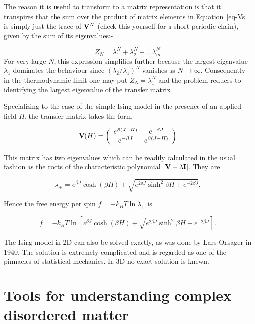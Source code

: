 \documentclass[
  letterpaper,
  DIV=11,
  numbers=noendperiod]{scrreprt}
\begin{document}
The reason it is useful to transform to a matrix representation is that
it transpires that the sum over the product of matrix elements in
Equation~\ref{eq-Vs} is simply just the trace of \({\bf V}^N\) (check
this yourself for a short periodic chain), given by the sum of its
eigenvalues:-

\[Z_N=\lambda_1^N+\lambda_2^N+...\lambda_m^N\] For very large \(N\),
this expression simplifies further because the largest eigenvalue
\(\lambda_1\) dominates the behaviour since \((\lambda_2/\lambda_1)^N\)
vanishes as \(N\rightarrow \infty\). Consequently in the thermodynamic
limit one may put \(Z_N=\lambda_1^N\) and the problem reduces to
identifying the largest eigenvalue of the transfer matrix.

Specializing to the case of the simple Ising model in the presence of an
applied field \(H\), the transfer matrix takes the form

\[{\bf V}(H)=\left(
\begin{array}{cc}
e^{\beta(J+H)} & e^{-\beta J} \\
e^{-\beta J}   & e^{\beta(J-H)}
\end{array} \right)\]

This matrix has two eigenvalues which can be readily calculated in the
usual fashion as the roots of the characteristic polynomial
\(|{\bf V}-\lambda{\bf I}|\). They are

\[\lambda_{\pm}=e^{\beta J}\cosh(\beta H) \pm \sqrt{e^{2\beta J}\sinh^2\beta H+e^{-2\beta J}}.\]

Hence the free energy per spin \(f=-k_BT\ln \lambda_+\) is

\[f=-k_BT\ln \left[e^{\beta J}\cosh(\beta H) + \sqrt{e^{2\beta J}\sinh^2\beta H+e^{-2\beta J}}\right].\]

The Ising model in 2D can also be solved exactly, as was done by Lars
Onsager in 1940. The solution is extremely complicated and is regarded
as one of the pinnacles of statistical mechanics. In 3D no exact
solution is known.

\chapter*{Tools for understanding complex disordered
matter}\label{tools-for-understanding-complex-disordered-matter}

\end{document}
